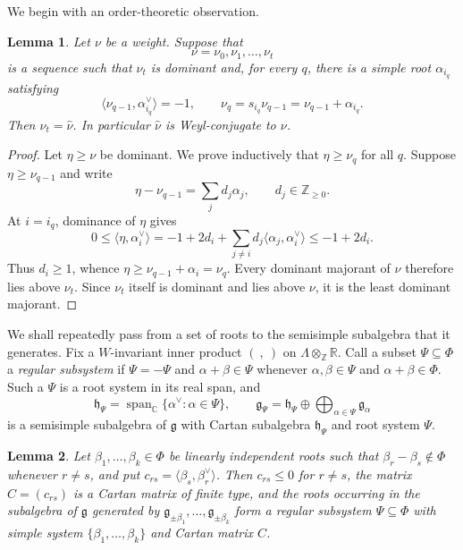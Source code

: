 \documentclass[11pt]{article}
\newtheorem{lemma}[lemma]{Lemma}
\theoremstyle{definition}
\theoremstyle{remark}
\newcommand{\Raiz}{\Phi}
\newcommand{\Pesos}{\Lambda}
\newcommand{\Weyl}{W}
\newcommand{\Z}{\mathbb Z}
\newcommand{\C}{\mathbb C}
\begin{document}
We begin with an order-theoretic observation.

\begin{lemma}\label{lem:path-unit-stabilization}
Let $\nu$ be a weight.  Suppose that
\[
   \nu=\nu_0,\nu_1,\ldots,\nu_t
\]
is a sequence such that $\nu_t$ is dominant and, for every $q$, there is a
simple root $\alpha_{i_q}$ satisfying
\[
   \langle\nu_{q-1},\alpha_{i_q}^\vee\rangle=-1,
   \qquad
   \nu_q=s_{i_q}\nu_{q-1}=\nu_{q-1}+\alpha_{i_q}.
\]
Then $\nu_t=\widehat\nu$.  In particular $\widehat\nu$ is Weyl-conjugate to
$\nu$.
\end{lemma}

\begin{proof}
Let $\eta\ge\nu$ be dominant.  We prove inductively that $\eta\ge\nu_q$ for
all $q$.  Suppose $\eta\ge\nu_{q-1}$ and write
\[
   \eta-\nu_{q-1}=\sum_j d_j\alpha_j,
   \qquad d_j\in\Z_{\ge0}.
\]
At $i=i_q$, dominance of $\eta$ gives
\[
 0\le\langle\eta,\alpha_i^\vee\rangle
   =-1+2d_i+\sum_{j\ne i}d_j\langle\alpha_j,\alpha_i^\vee\rangle
   \le -1+2d_i.
\]
Thus $d_i\ge1$, whence
$\eta\ge\nu_{q-1}+\alpha_i=\nu_q$.  Every dominant majorant of $\nu$ therefore
lies above $\nu_t$.  Since $\nu_t$ itself is dominant and lies above $\nu$,
it is the least dominant majorant.
\end{proof}

We shall repeatedly pass from a set of roots to the semisimple subalgebra that
it generates.  Fix a $\Weyl$-invariant inner product $(\ ,\ )$ on
$\Pesos\otimes_\Z\mathbb R$.  Call a subset $\Psi\subseteq\Raiz$ a
\emph{regular subsystem} if $\Psi=-\Psi$ and $\alpha+\beta\in\Psi$ whenever
$\alpha,\beta\in\Psi$ and $\alpha+\beta\in\Raiz$.  Such a $\Psi$ is a root
system in its real span, and
\[
   \mathfrak h_\Psi=\operatorname{span}_\C\{\alpha^\vee:\alpha\in\Psi\},
   \qquad
   \mathfrak g_\Psi=\mathfrak h_\Psi\oplus
        \bigoplus_{\alpha\in\Psi}\mathfrak g_\alpha
\]
is a semisimple subalgebra of $\mathfrak g$ with Cartan subalgebra
$\mathfrak h_\Psi$ and root system $\Psi$.

\begin{lemma}\label{lem:pi-system}
Let $\beta_1,\ldots,\beta_k\in\Raiz$ be linearly independent roots such that
$\beta_r-\beta_s\notin\Raiz$ whenever $r\ne s$, and put
$c_{rs}=\langle\beta_s,\beta_r^\vee\rangle$.  Then $c_{rs}\le0$ for $r\ne s$,
the matrix $C=(c_{rs})$ is a Cartan matrix of finite type, and the roots
occurring in the subalgebra of $\mathfrak g$ generated by
$\mathfrak g_{\pm\beta_1},\ldots,\mathfrak g_{\pm\beta_k}$ form a regular
subsystem $\Psi\subseteq\Raiz$ with simple system $\{\beta_1,\ldots,\beta_k\}$
and Cartan matrix $C$.
\end{lemma}
\end{document}
